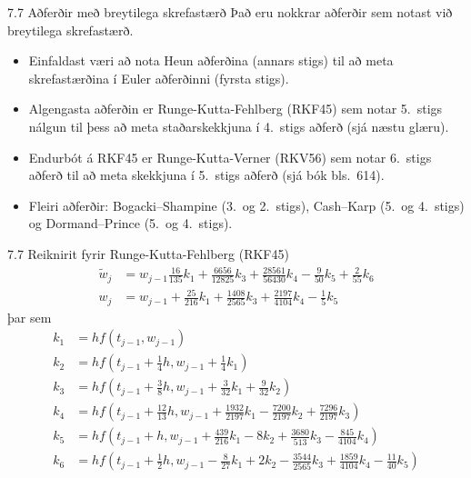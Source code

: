 \begin{frame}{7.7 Aðferðir með breytilega skrefastærð}
 Það eru nokkrar aðferðir sem notast við breytilega skrefastærð.\pause
 \begin{itemize}
  \item Einfaldast væri að nota Heun aðferðina (annars stigs) til að meta skrefastærðina í 
 Euler aðferðinni (fyrsta  stigs).\pause
 \item Algengasta aðferðin er Runge-Kutta-Fehlberg (RKF45) sem notar 5.~stigs nálgun
 til þess að meta staðarskekkjuna í 4.~stigs aðferð (sjá næstu glæru).\pause 
 \item Endurbót á RKF45 er Runge-Kutta-Verner (RKV56) sem notar 6.~stigs aðferð til að meta
 skekkjuna í 5.~stigs aðferð (sjá bók bls.~614).\pause
 \item Fleiri aðferðir: Bogacki–Shampine (3.~og 2.~stigs), 
 Cash–Karp (5.~og 4.~stigs) og Dormand–Prince (5.~og 4.~stigs).
 \end{itemize}

 
\end{frame}


\begin{frame}{7.7 Reiknirit fyrir Runge-Kutta-Fehlberg (RKF45)}
 \begin{align*}
  \tilde w_j &= w_{j-1} \frac{16}{135} k_1 + \frac{6656}{12825}k_3 + \frac{28561}{56430}k_4
  - \frac{9}{50}k_5 + \frac{2}{55}k_6\\
  w_j &= w_{j-1} + \frac{25}{216}k_1 + \frac{1408}{2565}k_3 + \frac{2197}{4104}k_4 - \frac 15 k_5
 \end{align*}
 \pause þar sem
 \begin{align*}
  k_1 &= hf(t_{j-1},w_{j-1}) \\  
  k_2 &= hf\left( t_{j-1}+\frac 14h, w_{j-1}+\frac 14k_1          \right)\\
  k_3 &= hf\left( t_{j-1}+\frac 38h, w_{j-1}+\frac 3{32}k_1 + \frac 9{32}k_2\right)\\
  k_4 &= hf\left( t_{j-1}+\frac{12}{13}h, w_{j-1} + \frac{1932}{2197}k_1 
  - \frac{7200}{2197}k_2 + \frac{7296}{2197}k_3 \right)\\
  k_5 &= hf\left( t_{j-1} +h, w_{j-1} + \frac{439}{216}k_1 - 8k_2+\frac{3680}{513}k_3 
  -\frac{845}{4104}k_4\right)\\
  k_6 &= hf\left( t_{j-1} +\frac 12h, w_{j-1} - \frac 8{27}k_1 + 2k_2 -\frac{3544}{2565}k_3
  +\frac{1859}{4104}k_4 - \frac{11}{40}k_5\right)\\
 \end{align*}

 
\end{frame}


